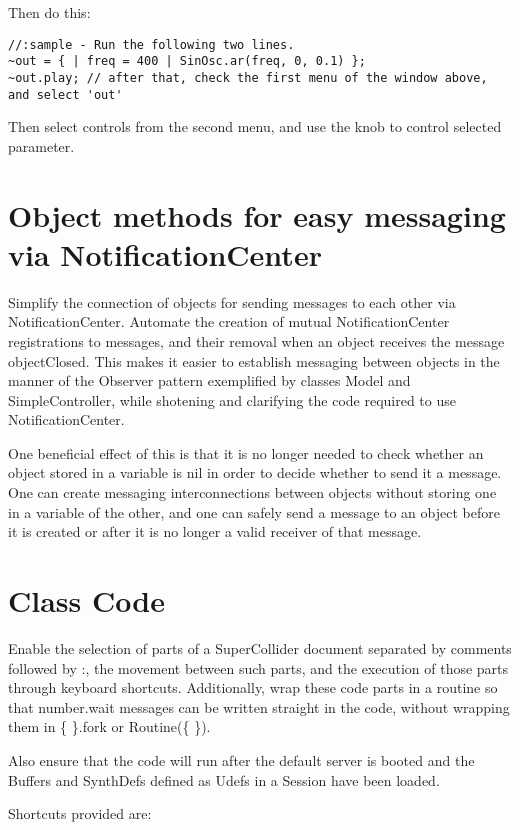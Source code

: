 \documentclass[11pt, a4paper]{scrartcl}
\begin{document}
Then do this: 

\begin{verbatim}
//:sample - Run the following two lines. 
~out = { | freq = 400 | SinOsc.ar(freq, 0, 0.1) };
~out.play; // after that, check the first menu of the window above, and select 'out'
\end{verbatim}


Then select controls from the second menu, and use the knob to control selected parameter.
\section*{Object methods for easy messaging via NotificationCenter}
\label{sec-6}


Simplify the connection of objects for sending messages to each other via NotificationCenter. Automate the creation of mutual NotificationCenter registrations to messages, and their removal when an object receives the message objectClosed. This makes it easier to establish messaging between objects in the manner of the Observer pattern exemplified by classes Model and SimpleController, while shotening and clarifying the code required to use NotificationCenter.

One beneficial effect of this is that it is no longer needed to check whether an object stored in a variable is nil in order to decide whether to send it a message. One can create messaging interconnections between objects without storing one in a variable of the other, and one can safely send a message to an object before it is created or after it is no longer a valid receiver of that message. 
\section*{Class Code}
\label{sec-7}


Enable the selection of parts of a SuperCollider document separated by comments followed by :, the movement between such parts, and the execution of those parts through keyboard shortcuts. Additionally, wrap these code parts in a routine so that number.wait messages can be written straight in the code, without wrapping them in \{ \}.fork or Routine(\{ \}). 

Also ensure that the code will run after the default server is booted and the Buffers and SynthDefs defined as Udefs in a Session have been loaded. 

Shortcuts provided are:
\end{document}
